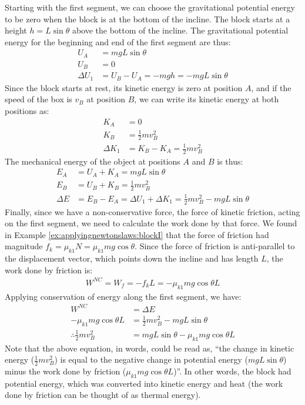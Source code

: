 \begin{example}
Starting with the first segment, we can choose the gravitational potential energy to be zero when the block is at the bottom of the incline. The block starts at a height $h=L\sin\theta$ above the  bottom of the incline. The gravitational potential energy for the beginning and end of the first segment are thus:
\begin{align*}
U_A &= mgL\sin\theta\\
U_B &= 0\\
\Delta U_1 &= U_B-U_A = -mgh = -mgL\sin\theta
\end{align*}
Since the block starts at rest, its kinetic energy is zero at position $A$, and if the speed of the box is $v_B$ at position $B$, we can write its kinetic energy at both positions as:
\begin{align*}
K_A &=0\\
K_B &= \frac{1}{2}mv_B^2\\
\Delta K_1 &=K_B-K_A= \frac{1}{2}mv_B^2
\end{align*}
The mechanical energy of the object at positions $A$ and $B$ is thus:
\begin{align*}
E_A &= U_A+K_A = mgL\sin\theta\\
E_B &= U_B+K_B = \frac{1}{2}mv_B^2\\
\Delta E &= E_B - E_A = \Delta U_1+\Delta K_1= \frac{1}{2}mv_B^2 - mgL\sin\theta
\end{align*}
Finally, since we have a non-conservative force, the force of kinetic friction, acting on the first segment, we need to calculate the work done by that force. We found in Example \ref{ex:applyingnewtonslaws:blockI} that the force of friction had magnitude $f_k=\mu_{k1}N=\mu_{k1}mg\cos\theta$. Since the force of friction is anti-parallel to the displacement vector, which points down the incline and has length $L$, the work done by friction is:
\begin{align*}
W^{NC}=W_f = -f_kL=-\mu_{k1}mg\cos\theta L
\end{align*}
Applying conservation of energy along the first segment, we have:
\begin{align*}
W^{NC} &= \Delta E\\
-\mu_{k1}mg\cos\theta L &= \frac{1}{2}mv_B^2 - mgL\sin\theta\\
\therefore \frac{1}{2}mv_B^2 &= mgL\sin\theta-\mu_{k1}mg\cos\theta L 
\end{align*}
Note that the above equation, in words, could be read as, ``the change in kinetic energy ($\frac{1}{2}mv_B^2$) is equal to the negative change in potential energy ($mgL\sin\theta$) minus the work done by friction ($\mu_{k1}mg\cos\theta L$)''. In other words, the block had potential energy, which was converted into kinetic energy and heat (the work done by friction can be thought of as thermal energy). 


\end{example}
